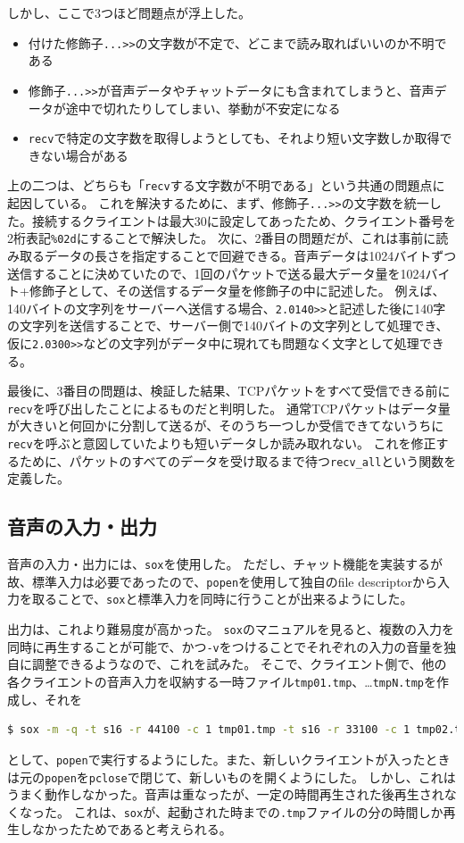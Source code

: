 \documentclass[a4paper]{ltjsarticle}
\begin{document}
しかし、ここで3つほど問題点が浮上した。
\begin{itemize}
    \item 付けた修飾子\verb|...>>|の文字数が不定で、どこまで読み取ればいいのか不明である
    \item 修飾子\verb|...>>|が音声データやチャットデータにも含まれてしまうと、音声データが途中で切れたりしてしまい、挙動が不安定になる
    \item \verb|recv|で特定の文字数を取得しようとしても、それより短い文字数しか取得できない場合がある
\end{itemize}
上の二つは、どちらも「\verb|recv|する文字数が不明である」という共通の問題点に起因している。
これを解決するために、まず、修飾子\verb|...>>|の文字数を統一した。接続するクライエントは最大30に設定してあったため、クライエント番号を2桁表記\verb|%02d|にすることで解決した。
次に、2番目の問題だが、これは事前に読み取るデータの長さを指定することで回避できる。音声データは1024バイトずつ送信することに決めていたので、1回のパケットで送る最大データ量を1024バイト+修飾子として、その送信するデータ量を修飾子の中に記述した。
例えば、140バイトの文字列をサーバーへ送信する場合、\verb|2.0140>>|と記述した後に140字の文字列を送信することで、サーバー側で140バイトの文字列として処理でき、仮に\verb|2.0300>>|などの文字列がデータ中に現れても問題なく文字として処理できる。

最後に、3番目の問題は、検証した結果、TCPパケットをすべて受信できる前に\verb|recv|を呼び出したことによるものだと判明した。
通常TCPパケットはデータ量が大きいと何回かに分割して送るが、そのうち一つしか受信できてないうちに\verb|recv|を呼ぶと意図していたよりも短いデータしか読み取れない。
これを修正するために、パケットのすべてのデータを受け取るまで待つ\verb|recv_all|という関数を定義した。

\subsection{音声の入力・出力}
音声の入力・出力には、\verb|sox|を使用した。
ただし、チャット機能を実装するが故、標準入力は必要であったので、\verb|popen|を使用して独自のfile descriptorから入力を取ることで、\verb|sox|と標準入力を同時に行うことが出来るようにした。

出力は、これより難易度が高かった。
\verb|sox|のマニュアルを見ると、複数の入力を同時に再生することが可能で、かつ\verb|-v|をつけることでそれぞれの入力の音量を独自に調整できるようなので、これを試みた\cite{sox manual}。
そこで、クライエント側で、他の各クライエントの音声入力を収納する一時ファイル\verb|tmp01.tmp|、\dots\verb|tmpN.tmp|を作成し、それを
\begin{lstlisting}[language=bash]
    $ sox -m -q -t s16 -r 44100 -c 1 tmp01.tmp -t s16 -r 33100 -c 1 tmp02.tmp ... -d
\end{lstlisting}
として、\verb|popen|で実行するようにした。また、新しいクライエントが入ったときは元の\verb|popen|を\verb|pclose|で閉じて、新しいものを開くようにした。
しかし、これはうまく動作しなかった。音声は重なったが、一定の時間再生された後再生されなくなった。
これは、\verb|sox|が、起動された時までの\verb|.tmp|ファイルの分の時間しか再生しなかったためであると考えられる。
\end{document}

